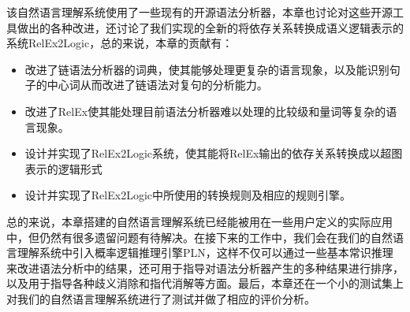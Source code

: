 该自然语言理解系统使用了一些现有的开源语法分析器，本章也讨论对这些开源工具做出的各种改进，还讨论了我们实现的全新的将依存关系转换成语义逻辑表示的系统RelEx2Logic，总的来说，本章的贡献有：

\begin{itemize}
\item 改进了链语法分析器的词典，使其能够处理更复杂的语言现象，以及能识别句子的中心词从而改进了链语法对复句的分析能力。
\item 改进了RelEx使其能处理目前语法分析器难以处理的比较级和量词等复杂的语言现象。
\item 设计并实现了RelEx2Logic系统，使其能将RelEx输出的依存关系转换成以超图表示的逻辑形式
\item 设计并实现了RelEx2Logic中所使用的转换规则及相应的规则引擎。
\end{itemize}

总的来说，本章搭建的自然语言理解系统已经能被用在一些用户定义的实际应用中，但仍然有很多遗留问题有待解决。在接下来的工作中，我们会在我们的自然语言理解系统中引入概率逻辑推理引擎PLN，这样不仅可以通过一些基本常识推理来改进语法分析中的结果，还可用于指导对语法分析器产生的多种结果进行排序，以及用于指导各种歧义消除和指代消解等方面。最后，本章还在一个小的测试集上对我们的自然语言理解系统进行了测试并做了相应的评价分析。



